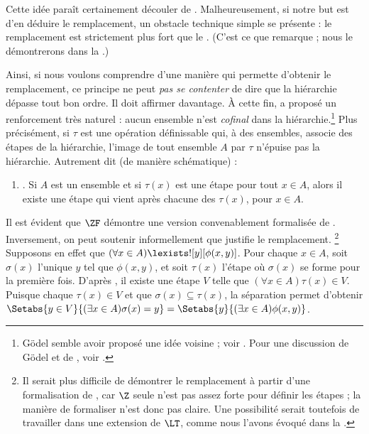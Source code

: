 \documentclass[../../../include/open-logic-section]{subfiles}
\begin{document}
Cette idée paraît certainement découler de \stagesinex.
Malheureusement, si notre but est d'en déduire le remplacement,
un obstacle technique simple se présente : le remplacement est
strictement plus fort que le
.
(C'est ce que remarque \citet[\S13.2]{Potter2004} ; nous le
démontrerons dans la
.)

Ainsi, si nous voulons comprendre \stagesinex{} d'une manière
qui permette d'obtenir le remplacement, ce principe ne peut
\emph{pas se contenter} de dire que la hiérarchie dépasse tout
bon ordre. Il doit affirmer davantage. À cette fin,
\cite{Shoenfield:AST} a proposé un renforcement très naturel :
aucun ensemble n'est \emph{cofinal} dans la hiérarchie.\footnote{
G\"odel semble avoir proposé une idée voisine ; voir
\citet[p.~223]{Potter2004}. Pour une discussion de G\"odel
et de \citeauthor{Shoenfield:AST}, voir
\citet[90--5]{Incurvati2020}.}
Plus précisément, si $\tau$ est une opération définissable qui, à des
ensembles, associe des étapes de la hiérarchie, l'image de tout
ensemble $A$ par $\tau$ n'épuise pas la hiérarchie. Autrement
dit (de manière schématique) :
\begin{enumerate}
	\item[] \stagescofin. Si $A$ est un ensemble et si
	$\tau(x)$ est une étape pour tout $x \in A$, alors il
	existe une étape qui vient après chacune des $\tau(x)$,
	pour $x \in A$.
\end{enumerate}
Il est évident que $\ZF$ démontre une version convenablement
formalisée de \stagescofin. Inversement, on peut soutenir
informellement que \stagescofin{} justifie le remplacement.
\footnote{Il serait plus difficile de démontrer le remplacement
à partir d'une formalisation de \stagescofin, car $\Z$ seule
n'est pas assez forte pour définir les étapes ; la manière
de formaliser \stagescofin{} n'est donc pas claire. Une possibilité
serait toutefois de travailler dans une extension de $\LT$,
comme nous l'avons évoqué dans la
.}
Supposons en effet que
$(\forall x \in A)\lexists![y][\phi(x,y)]$. Pour chaque
$x \in A$, soit $\sigma(x)$ l'unique $y$ tel que $\phi(x,y)$,
et soit $\tau(x)$ l'étape où $\sigma(x)$ se forme pour la
première fois. D'après \stagescofin, il existe une étape $V$
telle que $(\forall x \in A)\tau(x)\in V$. Puisque chaque
$\tau(x) \in V$ et que $\sigma(x) \subseteq \tau(x)$,
la séparation permet d'obtenir
$\Setabs{y \in V}{(\exists x \in A)\sigma(x) = y}
= \Setabs{y}{(\exists x \in A)\phi(x,y)}$.
\end{document}
